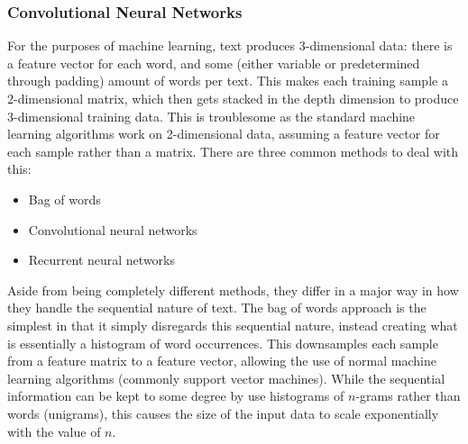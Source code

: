 \subsubsection{Convolutional Neural Networks}
For the purposes of machine learning,
text produces 3-dimensional data: there is a feature vector for each word, and
some (either variable or predetermined through padding) amount of words per
text. This makes each training sample a 2-dimensional matrix, which then gets
stacked in the depth dimension to produce 3-dimensional training data. This is
troublesome as the standard machine learning algorithms work on 2-dimensional
data, assuming a feature vector for each sample rather than a matrix. There are
three common methods to deal with this:
\begin{itemize}
\item Bag of words
\item Convolutional neural networks
\item Recurrent neural networks
\end{itemize}

Aside from being completely different methods, they differ in a major way in how
they handle the sequential nature of text. The bag of words approach is the
simplest in that it simply disregards this sequential nature, instead creating
what is essentially a histogram of word occurrences. This downsamples each
sample from a feature matrix to a feature vector, allowing the use of normal
machine learning algorithms (commonly support vector machines). While the
sequential information can be kept to some degree by use histograms of $n$-grams
rather than words (unigrams), this causes the size of the input data to scale
exponentially with the value of $n$.

